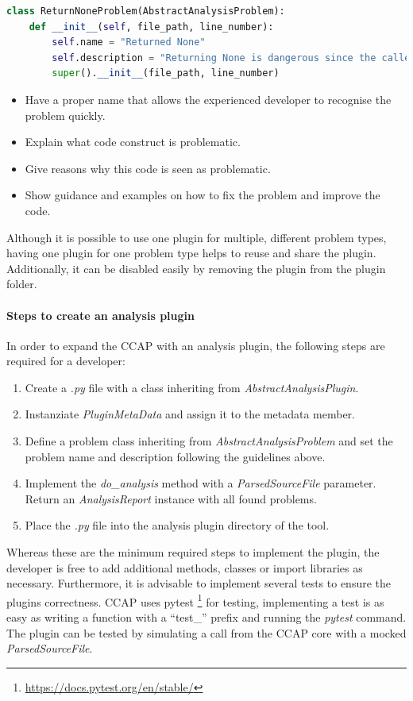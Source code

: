\begin{lstlisting}[language=Python, label=lst:return_none_problem_override, caption={Example for overwriting the \textit{AbstractAnalysisProblem} with a concete implmentation. The problem name and description are overwritten.}]
class ReturnNoneProblem(AbstractAnalysisProblem):
    def __init__(self, file_path, line_number):
        self.name = "Returned None"
        self.description = "Returning None is dangerous since the caller has to check for None. Otherwise, a runtime exception may occur."
        super().__init__(file_path, line_number)
\end{lstlisting}

\begin{itemize}
    \item Have a proper name that allows the experienced developer to recognise the problem quickly.
    \item Explain what code construct is problematic.
    \item Give reasons why this code is seen as problematic.
    \item Show guidance and examples on how to fix the problem and improve the code.
\end{itemize}
Although it is possible to use one plugin for multiple, different problem types, having one plugin for one problem type helps to reuse and share the plugin. Additionally, it can be disabled easily by removing the plugin from the plugin folder.

\paragraph{Steps to create an analysis plugin}
In order to expand the CCAP with an analysis plugin, the following steps are required for a developer:
\begin{enumerate}
    \item Create a \textit{.py} file with a class inheriting from \textit{AbstractAnalysisPlugin}.
    \item Instanziate \textit{PluginMetaData} and assign it to the metadata member.
    \item Define a problem class inheriting from \textit{AbstractAnalysisProblem} and set the problem name and description following the guidelines above.
    \item Implement the \textit{do\_analysis} method with a \textit{ParsedSourceFile} parameter. Return an \textit{AnalysisReport} instance with all found problems.
    \item Place the \textit{.py} file into the analysis plugin directory of the tool.
\end{enumerate}
Whereas these are the minimum required steps to implement the plugin, the developer is free to add additional methods, classes or import libraries as necessary.
Furthermore, it is advisable to implement several tests to ensure the plugins correctness. CCAP uses pytest \footnote{\url{https://docs.pytest.org/en/stable/}} for testing, implementing a test is as easy as writing a function with a \enquote{test\_} prefix and running the \textit{pytest} command. The plugin can be tested by simulating a call from the CCAP core with a mocked \textit{ParsedSourceFile}. 


